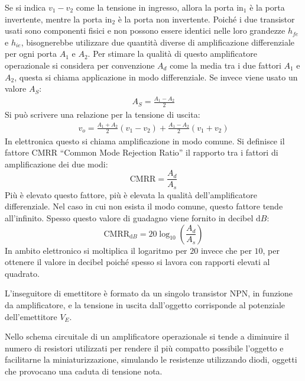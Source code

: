 \documentclass{article}
\newcommand{\df}{\mathrm{d}}
\numberwithin{equation}{subsection}
\begin{document}
Se si indica $v_1-v_2$ come la tensione in ingresso, allora la porta $\mathrm{in_1}$ è la porta invertente, mentre la porta $\mathrm{in_2}$ è la porta non invertente.
Poiché i due transistor usati sono componenti fisici e non possono essere identici nelle loro grandezze $h_{fe}$ e $h_{ie}$, bisognerebbe utilizzare 
due quantità diverse di amplificazione differenziale per ogni porta $A_{1}$ e $A_{2}$. Per stimare la qualità di questo amplificatore 
operazionale si considera per convenzione $A_d$ come la media tra i due fattori $A_1$ e $A_2$, questa si chiama applicazione in modo differenziale. 
Se invece viene usato un valore $A_S$:
\begin{gather*}
    A_S=\displaystyle\frac{A_1-A_2}{2}
\end{gather*}
Si può scrivere una relazione per la tensione di uscita:
\begin{gather*}
    v_o=\displaystyle\frac{A_1+A_2}{2}(v_1-v_2)+\frac{A_1-A_2}{2}(v_1+v_2)
\end{gather*}
In elettronica questo si chiama amplificazione in modo comune. 
Si definisce il fattore CMRR ``Common Mode Rejection Ratio'' il rapporto tra i fattori di amplificazione dei due modi:
\begin{equation*}
    \mathrm{CMRR}=\displaystyle\frac{A_d}{A_s}
\end{equation*}
Più è elevato questo fattore, più è elevata la qualità dell'amplificatore differenziale. Nel caso in cui non esista il modo comune, questo fattore 
tende all'infinito. Spesso questo valore di guadagno viene fornito in decibel $\df B$:
\begin{equation*}
    \mathrm{CMRR}_{\df B}=\displaystyle20\log_{10}\left(\frac{A_d}{A_s}\right)
\end{equation*}
In ambito elettronico si moltiplica il logaritmo per $20$ invece che per $10$, per ottenere il valore in decibel poiché spesso si lavora con rapporti elevati al quadrato. 


L'inseguitore di emettitore è formato da un singolo transistor NPN, in funzione da amplificatore, e la tensione in uscita dall'oggetto corrisponde 
al potenziale dell'emettitore $V_E$. 

Nello schema circuitale di un amplificatore operazionale si tende a diminuire il numero di resistori utilizzati per rendere il più compatto possibile 
l'oggetto e facilitarne la miniaturizzazione, simulando le resistenze utilizzando diodi, oggetti che provocano una caduta di tensione nota. 
\end{document}

